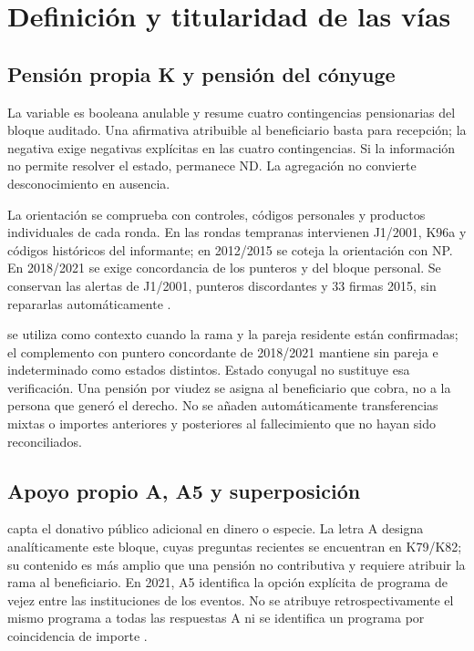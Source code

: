 \section{Definición y titularidad de las vías}
\label{sec:proteccion-metodo}
\label{sec:pensiones-metodo}

\subsection{Pensión propia K y pensión del cónyuge}

La variable  es booleana anulable y resume cuatro
contingencias pensionarias del bloque auditado. Una afirmativa atribuible
al beneficiario basta para recepción; la negativa exige negativas explícitas
en las cuatro contingencias. Si la información no permite resolver el estado,
permanece ND. La agregación no convierte desconocimiento en ausencia.

La orientación se comprueba con controles, códigos personales y productos
individuales de cada ronda. En las rondas tempranas intervienen J1/2001,
K96a y códigos históricos del informante; en 2012/2015 se coteja la orientación
con NP. En 2018/2021 se exige concordancia de los punteros y del bloque
personal. Se conservan las alertas de J1/2001, punteros discordantes y
33 firmas 2015, sin repararlas automáticamente
\citep{enasem2001imputacion,enasem2003imputacion,enasem2012imputacion,
enasem2015imputacion,enasem2018imputacion,enasem2021imputacion}.

 se utiliza como contexto cuando la rama y la
pareja residente están confirmadas; el complemento con puntero concordante
de 2018/2021 mantiene sin pareja e indeterminado como estados distintos.
Estado conyugal no sustituye esa verificación. Una pensión por viudez se
asigna al beneficiario que cobra, no a la persona que generó el derecho.
No se añaden automáticamente transferencias mixtas o importes anteriores
y posteriores al fallecimiento que no hayan sido reconciliados.

\subsection{Apoyo propio A, A5 y superposición}

 capta el donativo público adicional en dinero o
especie. La letra A designa analíticamente este bloque, cuyas preguntas
recientes se encuentran en K79/K82; su contenido es más amplio que una
pensión no contributiva y requiere atribuir la rama al beneficiario.
En 2021, A5 identifica la opción explícita de programa de vejez entre las
instituciones de los eventos. No se atribuye retrospectivamente el mismo
programa a todas las respuestas A ni se identifica un programa por coincidencia
de importe \citep{inegi2021k}.

